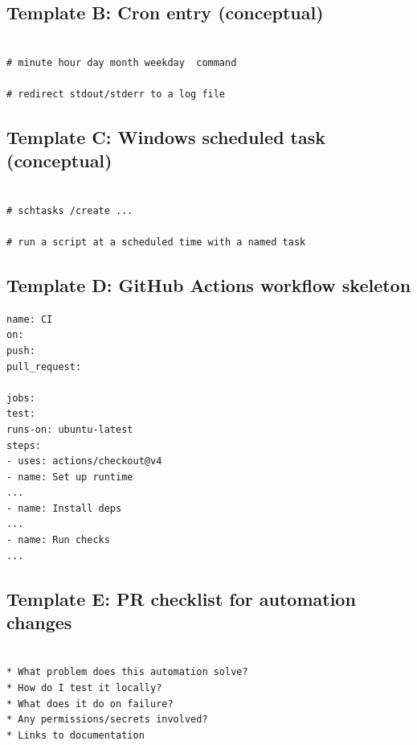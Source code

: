 \subsection{Template B: Cron entry (conceptual)}
\begin{verbatim}

# minute hour day month weekday  command

# redirect stdout/stderr to a log file

\end{verbatim}

\subsection{Template C: Windows scheduled task (conceptual)}
\begin{verbatim}

# schtasks /create ...

# run a script at a scheduled time with a named task

\end{verbatim}

\subsection{Template D: GitHub Actions workflow skeleton}
\begin{verbatim}
name: CI
on:
push:
pull_request:

jobs:
test:
runs-on: ubuntu-latest
steps:
- uses: actions/checkout@v4
- name: Set up runtime
...
- name: Install deps
...
- name: Run checks
...
\end{verbatim}

\subsection{Template E: PR checklist for automation changes}
\begin{verbatim}

* What problem does this automation solve?
* How do I test it locally?
* What does it do on failure?
* Any permissions/secrets involved?
* Links to documentation
  \end{verbatim}


